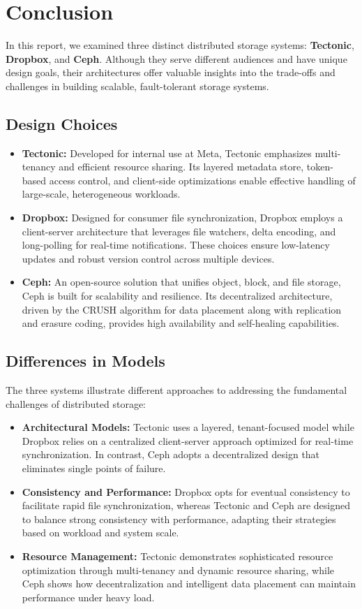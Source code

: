 \chapter{Conclusion}\label{chap:conclusion}

In this report, we  examined three distinct distributed storage systems: \textbf{Tectonic}, \textbf{Dropbox}, and \textbf{Ceph}. Although they serve different audiences and have unique design goals, their architectures offer valuable insights into the trade-offs and challenges in building scalable, fault-tolerant storage systems.

\section{Design Choices}
\begin{itemize}
    \item \textbf{Tectonic:} Developed for internal use at Meta, Tectonic emphasizes multi-tenancy and efficient resource sharing. Its layered metadata store, token-based access control, and client-side optimizations enable effective handling of large-scale, heterogeneous workloads.
    \item \textbf{Dropbox:} Designed for consumer file synchronization, Dropbox employs a client-server architecture that leverages file watchers, delta encoding, and long-polling for real-time notifications. These choices ensure low-latency updates and robust version control across multiple devices.
    \item \textbf{Ceph:} An open-source solution that unifies object, block, and file storage, Ceph is built for scalability and resilience. Its decentralized architecture, driven by the CRUSH algorithm for data placement along with replication and erasure coding, provides high availability and self-healing capabilities.
\end{itemize}

\section{Differences in Models}
The three systems illustrate different approaches to addressing the fundamental challenges of distributed storage:
\begin{itemize}
    \item \textbf{Architectural Models:} Tectonic uses a layered, tenant-focused model while Dropbox relies on a centralized client-server approach optimized for real-time synchronization. In contrast, Ceph adopts a decentralized design that eliminates single points of failure.
    \item \textbf{Consistency and Performance:} Dropbox opts for eventual consistency to facilitate rapid file synchronization, whereas Tectonic and Ceph are designed to balance strong consistency with performance, adapting their strategies based on workload and system scale.
    \item \textbf{Resource Management:} Tectonic demonstrates sophisticated resource optimization through multi-tenancy and dynamic resource sharing, while Ceph shows how decentralization and intelligent data placement can maintain performance under heavy load.
\end{itemize}

